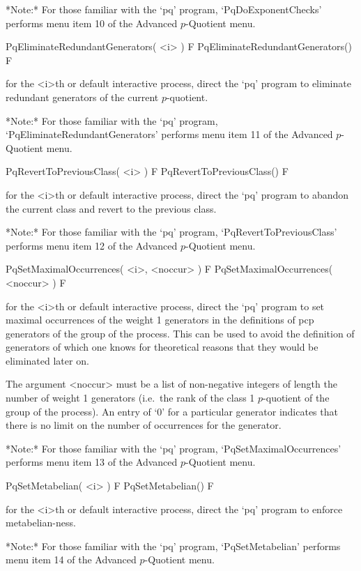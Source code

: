 *Note:*
For those familiar with the `pq'  program,  `PqDoExponentChecks'  performs
menu item 10 of the Advanced $p$-Quotient menu.

\>PqEliminateRedundantGenerators( <i> ) F
\>PqEliminateRedundantGenerators() F

for the <i>th or default interactive {\ANUPQ} process, direct  the  `pq'
program to eliminate redundant generators of the current $p$-quotient.

*Note:* 
For those familiar with the `pq' program, `PqEliminateRedundantGenerators'
performs menu item 11 of the Advanced $p$-Quotient menu.

\>PqRevertToPreviousClass( <i> ) F
\>PqRevertToPreviousClass() F

for the <i>th or default interactive {\ANUPQ} process, direct  the  `pq'
program to abandon the current class and revert to the previous class.

*Note:*
For  those  familiar  with  the  `pq'  program,  `PqRevertToPreviousClass'
performs menu item 12 of the Advanced $p$-Quotient menu.

\>PqSetMaximalOccurrences( <i>, <noccur> ) F
\>PqSetMaximalOccurrences( <noccur> ) F

for the  <i>th or default  interactive {\ANUPQ} process, direct  the `pq'
program  to set maximal  occurrences of  the weight  1 generators  in the
definitions of pcp  generators of the group of the  process.  This can be
used  to  avoid the  definition  of generators  of  which  one knows  for
theoretical reasons that they would be eliminated later on.

The argument <noccur>  must be a list of  non-negative integers of length
the  number  of  weight  1  generators  (i.e.~the rank  of  the  class  1
$p$-quotient  of  the group  of  the  process). An  entry  of  `0' for  a
particular generator  indicates that there is  no limit on  the number of
occurrences for the generator.


*Note:*
For  those  familiar  with  the  `pq'  program,  `PqSetMaximalOccurrences'
performs menu item 13 of the Advanced $p$-Quotient menu.

\>PqSetMetabelian( <i> ) F
\>PqSetMetabelian() F

for the <i>th or default interactive {\ANUPQ} process,  direct  the  `pq'
program to enforce metabelian-ness.

*Note:* 
For those familiar  with  the  `pq'  program,  `PqSetMetabelian'  performs
menu item 14 of the Advanced $p$-Quotient menu.

